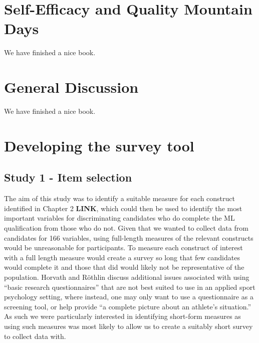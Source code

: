\documentclass[a4paper,]{book}
\begin{document}
\hypertarget{self-efficacy-and-quality-mountain-days}{%
\chapter{Self-Efficacy and Quality Mountain Days}\label{self-efficacy-and-quality-mountain-days}}

We have finished a nice book.

\hypertarget{general-discussion}{%
\chapter{General Discussion}\label{general-discussion}}

We have finished a nice book.

\hypertarget{appendix-appendix}{%
\appendix}


\hypertarget{developing-the-survey-tool}{%
\chapter{Developing the survey tool}\label{developing-the-survey-tool}}

\hypertarget{study-1---item-selection}{%
\section{Study 1 - Item selection}\label{study-1---item-selection}}

The aim of this study was to identify a suitable measure for each construct identified in Chapter 2 \textbf{LINK}, which could then be used to identify the most important variables for discriminating candidates who do complete the ML qualification from those who do not. Given that we wanted to collect data from candidates for 166 variables, using full-length measures of the relevant constructs would be unreasonable for participants. To measure each construct of interest with a full length measure would create a survey so long that few candidates would complete it and those that did would likely not be representative of the population. Horvath and Röthlin \citeyearpar{Horvath2018} discuss additional issues associated with using ``basic research questionnaires'' that are not best suited to use in an applied sport psychology setting, where instead, one may only want to use a questionnaire as a screening tool, or help provide ``a complete picture about an athlete's situation.'' As such we were particularly interested in identifying short-form measures as using such measures was most likely to allow us to create a suitably short survey to collect data with.
\end{document}
